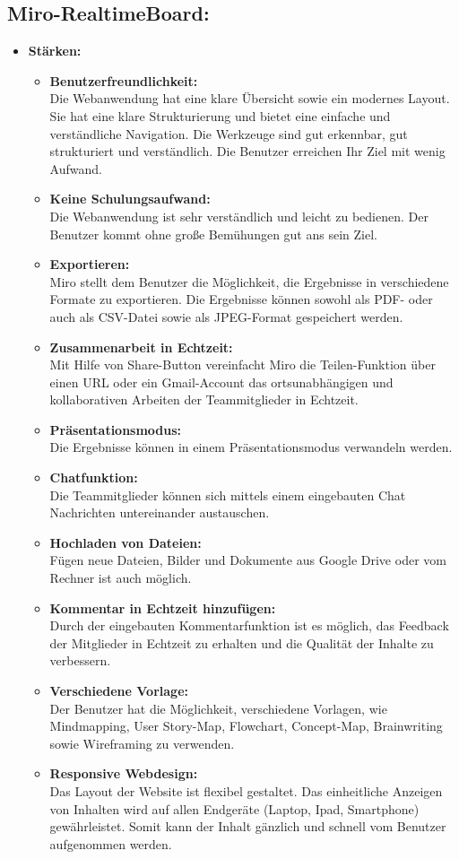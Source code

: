 \subsection{Miro-RealtimeBoard:}
\label{sec:stärken und schwächen von miro}
\begin{itemize}
\item \textbf{Stärken:}
\begin{itemize}
\item \textbf{Benutzerfreundlichkeit:}\\
Die Webanwendung hat eine klare Übersicht sowie ein modernes Layout. Sie hat eine klare Strukturierung und bietet eine einfache und verständliche Navigation. Die Werkzeuge sind gut erkennbar, gut strukturiert und verständlich. Die Benutzer erreichen Ihr Ziel mit wenig Aufwand.
\item \textbf{Keine Schulungsaufwand:}\\
Die Webanwendung ist sehr verständlich und leicht zu bedienen. Der Benutzer kommt ohne große Bemühungen gut ans sein Ziel.
\item \textbf{Exportieren:}\\
Miro stellt dem Benutzer die Möglichkeit, die Ergebnisse in verschiedene Formate zu exportieren. Die Ergebnisse können sowohl als PDF- oder auch als CSV-Datei sowie als JPEG-Format gespeichert werden.
\item \textbf{Zusammenarbeit in Echtzeit:}\\
Mit Hilfe von Share-Button vereinfacht Miro die Teilen-Funktion über einen URL oder ein Gmail-Account das ortsunabhängigen und kollaborativen Arbeiten der Teammitglieder in Echtzeit.
\item \textbf{Präsentationsmodus:}\\
Die Ergebnisse können in einem Präsentationsmodus verwandeln werden.
\item \textbf{Chatfunktion:}\\
Die Teammitglieder können sich mittels einem eingebauten Chat Nachrichten untereinander austauschen.
\item \textbf{Hochladen von Dateien:}\\
Fügen neue Dateien, Bilder und Dokumente aus Google Drive oder vom Rechner ist auch möglich.
\item \textbf{Kommentar in Echtzeit hinzufügen:}\\
Durch der eingebauten Kommentarfunktion ist es möglich, das Feedback der Mitglieder in Echtzeit zu erhalten und die Qualität der Inhalte zu verbessern. 
\item \textbf{Verschiedene Vorlage:}\\
Der Benutzer hat die Möglichkeit, verschiedene Vorlagen, wie Mindmapping, User Story-Map, Flowchart, Concept-Map, Brainwriting sowie Wireframing zu verwenden.
\item \textbf{Responsive Webdesign:}\\
Das Layout der Website ist flexibel gestaltet. Das einheitliche Anzeigen von Inhalten wird auf allen Endgeräte (Laptop, Ipad, Smartphone) gewährleistet. Somit kann der Inhalt gänzlich und schnell vom Benutzer aufgenommen werden.
\end{itemize}
\end{itemize}

